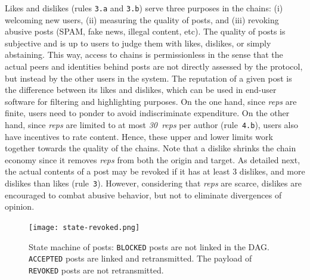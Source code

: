 \documentclass[10pt,journal,compsoc]{IEEEtran}
\newcommand{\reps}     {\emph{reps}\xspace}
\newcommand{\nreps}[1] {\emph{#1~reps\xspace}}
\newcommand{\code}[1]  {\texttt{\footnotesize{#1}}}
\begin{document}
Likes and dislikes (rules \code{3.a} and \code{3.b}) serve three purposes
in the chains:
    (i) welcoming new users,
    (ii) measuring the quality of posts, and
    (iii) revoking abusive posts (SPAM, fake news, illegal content, etc).
%
The quality of posts is subjective and is up to users to judge them with likes,
dislikes, or simply abstaining.
%
This way, access to chains is permissionless in the sense that the actual peers
and identities behind posts are not directly assessed by the protocol, but
instead by the other users in the system.
%
The reputation of a given post is the difference between its likes and
dislikes, which can be used in end-user software for filtering and highlighting
purposes.
%
On the one hand, since \reps are finite, users need to ponder to avoid
indiscriminate expenditure.
On the other hand, since \reps are limited to at most \nreps{30} per author
(rule~\code{4.b}), users also have incentives to rate content.
Hence, these upper and lower limits work together towards the quality of the
chains.
%
Note that a dislike shrinks the chain economy since it removes \reps from both
the origin and target.
As detailed next, the actual contents of a post may be revoked if it has at
least 3 dislikes, and more dislikes than likes (rule~\code{3}).
However, considering that \reps are scarce, dislikes are encouraged to combat
abusive behavior, but not to eliminate divergences of opinion.

\begin{figure}
\centering
\texttt{[image: state-revoked.png]}
\caption{
    State machine of posts:
    \code{BLOCKED} posts are not linked in the DAG.
    \code{ACCEPTED} posts are linked and retransmitted.
    The payload of \code{REVOKED} posts are not retransmitted.
}
\label{fig.state}
\end{figure}
\end{document}
